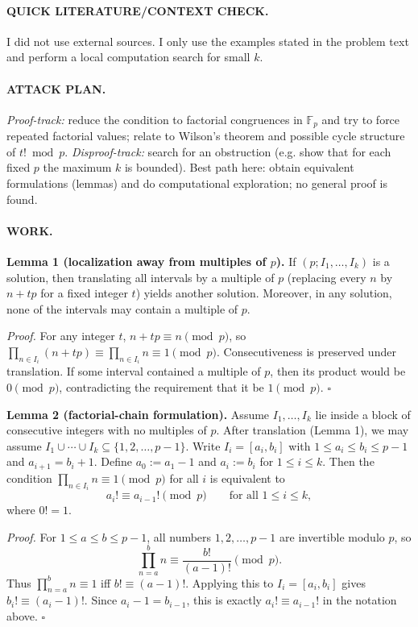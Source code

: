 \paragraph{QUICK LITERATURE/CONTEXT CHECK.}
I did not use external sources. I only use the examples stated in the problem text and perform a local computation search for small $k$.

\paragraph{ATTACK PLAN.}
\emph{Proof-track:} reduce the condition to factorial congruences in $\mathbb{F}_p$ and try to force repeated factorial values; relate to Wilson's theorem and possible cycle structure of $t!\bmod p$.
\emph{Disproof-track:} search for an obstruction (e.g. show that for each fixed $p$ the maximum $k$ is bounded).
Best path here: obtain equivalent formulations (lemmas) and do computational exploration; no general proof is found.

\paragraph{WORK.}
\textbf{Lemma 1 (localization away from multiples of $p$).}
If $(p;I_1,\dots,I_k)$ is a solution, then translating all intervals by a multiple of $p$ (replacing every $n$ by $n+tp$ for a fixed integer $t$) yields another solution.
Moreover, in any solution, none of the intervals may contain a multiple of $p$.

\emph{Proof.}
For any integer $t$, $n+tp\equiv n\pmod p$, so
$\prod_{n\in I_i}(n+tp)\equiv \prod_{n\in I_i}n\equiv 1\pmod p$.
Consecutiveness is preserved under translation.
If some interval contained a multiple of $p$, then its product would be $0\pmod p$, contradicting the requirement that it be $1\pmod p$.
\hfill$\square$

\textbf{Lemma 2 (factorial-chain formulation).}
Assume $I_1,\dots,I_k$ lie inside a block of consecutive integers with no multiples of $p$.
After translation (Lemma 1), we may assume
$I_1\cup\cdots\cup I_k \subseteq \{1,2,\dots,p-1\}$.
Write $I_i=[a_i,b_i]$ with $1\le a_i\le b_i\le p-1$ and $a_{i+1}=b_i+1$.
Define $a_0:=a_1-1$ and $a_i:=b_i$ for $1\le i\le k$.
Then the condition $\prod_{n\in I_i} n \equiv 1\pmod p$ for all $i$ is equivalent to
\[
a_{i}! \equiv a_{i-1}! \pmod p\qquad\text{for all }1\le i\le k,
\]
where $0!=1$.

\emph{Proof.}
For $1\le a\le b\le p-1$, all numbers $1,2,\dots,p-1$ are invertible modulo $p$, so
\[
\prod_{n=a}^{b} n \equiv \frac{b!}{(a-1)!}\pmod p.
\]
Thus $\prod_{n=a}^{b}n\equiv 1$ iff $b!\equiv (a-1)!$.
Applying this to $I_i=[a_i,b_i]$ gives $b_i!\equiv (a_i-1)!$.
Since $a_i-1=b_{i-1}$, this is exactly $a_i!\equiv a_{i-1}!$ in the notation above.
\hfill$\square$

